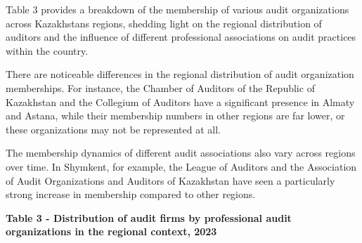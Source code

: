Table 3 provides a breakdown of the membership of various audit
organizations across Kazakhstan\textquotesingle s regions, shedding
light on the regional distribution of auditors and the influence of
different professional associations on audit practices within the
country.

There are noticeable differences in the regional distribution of audit
organization memberships. For instance, the Chamber of Auditors of the
Republic of Kazakhstan and the Collegium of Auditors have a significant
presence in Almaty and Astana, while their membership numbers in other
regions are far lower, or these organizations may not be represented at
all.

The membership dynamics of different audit associations also vary across
regions over time. In Shymkent, for example, the League of Auditors and
the Association of Audit Organizations and Auditors of Kazakhstan have
seen a particularly strong increase in membership compared to other
regions.

\hl{}

\textbf{Table 3 - Distribution of audit firms by professional audit
organizations in the regional context, 2023}

